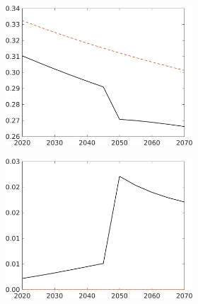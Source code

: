 \begin{figure}[h!!]
\begin{subfigure}{1\textwidth}
\begin{subfigure}[]{0.32\textwidth}
		\end{subfigure}	
		\begin{subfigure}[]{0.32\textwidth}
			\includegraphics[width=1\textwidth]{../../codding_model/own_basedOnFried/optimalPol_010922_revision/figures/all_13Sept22_Tplus30/sn_LFCompOPT_T_NoTaus_regime4_spillover0_noskill0_sep0_xgrowth0_PV1_etaa0.79_lgd0.png}
		\end{subfigure}	
		\begin{subfigure}[]{0.32\textwidth}
			\includegraphics[width=1\textwidth]{../../codding_model/own_basedOnFried/optimalPol_010922_revision/figures/all_13Sept22_Tplus30/sg_LFCompOPT_T_NoTaus_regime4_spillover0_noskill0_sep0_xgrowth0_PV1_etaa0.79_lgd0.png}

\end{subfigure}
\end{subfigure}
\end{figure}
